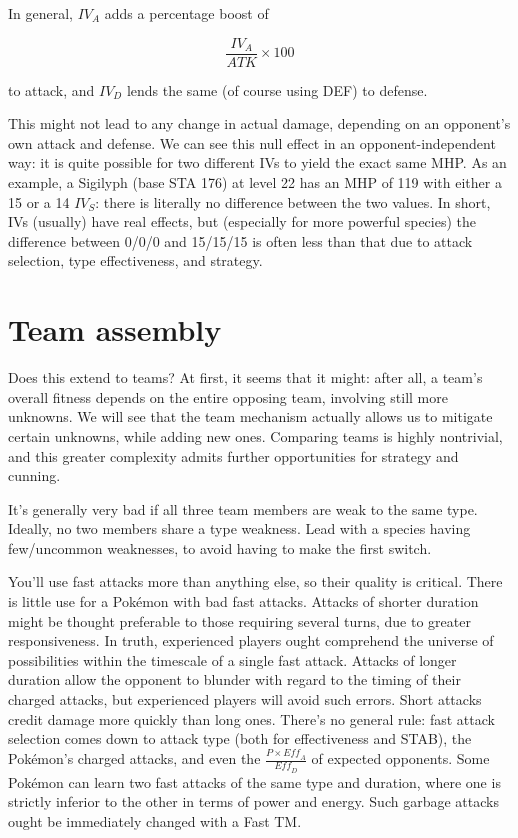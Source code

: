 In general, $IV_A$ adds a percentage boost of

\[ \frac{IV_A}{ATK} \times 100 \]

\noindent{}to attack, and $IV_D$ lends the same (of course using DEF) to defense.

This might not lead to any change in actual damage, depending on
  an opponent's own attack and defense.
We can see this null effect in an opponent-independent way: it is quite possible
  for two different IVs to yield the exact same MHP.
As an example, a Sigilyph (base STA 176) at level 22 has an MHP of 119 with
  either a 15 or a 14 $IV_S$: there is literally no difference between the
  two values.
In short, IVs (usually) have real effects, but (especially for more powerful species)
  the difference between 0/0/0 and 15/15/15 is often less than that due to
  attack selection, type effectiveness, and strategy.

\section{Team assembly}
Does this extend to teams?
At first, it seems that it might: after all, a team's overall fitness
 depends on the entire opposing team, involving still more unknowns.
We will see that the team mechanism actually allows us to mitigate certain
 unknowns, while adding new ones.
Comparing teams is highly nontrivial, and this greater complexity admits
 further opportunities for strategy and cunning.

It's generally very bad if all three team members are weak to the same type.
Ideally, no two members share a type weakness.
Lead with a species having few/uncommon weaknesses, to avoid having to make the first switch.

You'll use fast attacks more than anything else, so their quality is critical.
There is little use for a Pokémon with bad fast attacks.
Attacks of shorter duration might be thought preferable to those requiring
  several turns, due to greater responsiveness.
In truth, experienced players ought comprehend the universe of possibilities
  within the timescale of a single fast attack.
Attacks of longer duration allow the opponent to blunder with regard to the
  timing of their charged attacks, but experienced players will avoid
  such errors.
Short attacks credit damage more quickly than long ones.
There's no general rule: fast attack selection comes down to attack type
  (both for effectiveness and STAB), the Pokémon's charged attacks,
  and even the $\frac{P \times \mathit{Eff_A}}{\mathit{Eff_D}}$ of expected opponents.
Some Pokémon can learn two fast attacks of the same type and duration,
  where one is strictly inferior to the other in terms of power and
  energy.
Such garbage attacks ought be immediately changed with a Fast TM\@.

